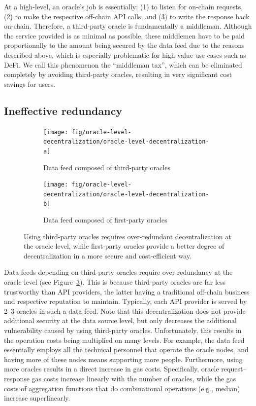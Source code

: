 \documentclass[11pt]{article}
\begin{document}
At a high-level, an oracle’s job is essentially: (1) to listen for on-chain requests, (2) to make the respective off-chain API calls, and (3) to write the response back on-chain.
Therefore, a third-party oracle is fundamentally a middleman.
Although the service provided is as minimal as possible, these middlemen have to be paid proportionally to the amount being secured by the data feed due to the reasons described above, which is especially problematic for high-value use cases such as DeFi.
We call this phenomenon the ``middleman tax'', which can be eliminated completely by avoiding third-party oracles, resulting in very significant cost savings for users.

\subsection{Ineffective redundancy}
\label{sec:ineffective-redundancy}

\begin{figure}
    \centering
    \begin{subfigure}{0.5\textwidth}
         \centering
         \texttt{[image: fig/oracle-level-decentralization/oracle-level-decentralization-a]}
         \caption{Data feed composed of third-party oracles}
         \label{fig:oracle-level-decentralization-a}
     \end{subfigure}
     \hfill
     \begin{subfigure}{0.49\textwidth}
         \centering
         \texttt{[image: fig/oracle-level-decentralization/oracle-level-decentralization-b]}
         \caption{Data feed composed of first-party oracles}
         \label{fig:oracle-level-decentralization-b}
     \end{subfigure}
	\caption{Using third-party oracles requires over-redundant decentralization at the oracle level, while first-party oracles provide a better degree of decentralization in a more secure and cost-efficient way.}
	\label{fig:oracle-level-decentralization}
\end{figure}

Data feeds depending on third-party oracles require over-redundancy at the oracle level (see Figure~\ref{fig:oracle-level-decentralization}).
This is because third-party oracles are far less trustworthy than API providers, the latter having a traditional off-chain business and respective reputation to maintain.
Typically, each API provider is served by 2--3 oracles in such a data feed.
Note that this decentralization does not provide additional security at the data source level, but only decreases the additional vulnerability caused by using third-party oracles.
Unfortunately, this results in the operation costs being multiplied on many levels.
For example, the data feed essentially employs all the technical personnel that operate the oracle nodes, and having more of these nodes means supporting more people.
Furthermore, using more oracles results in a direct increase in gas costs.
Specifically, oracle request--response gas costs increase linearly with the number of oracles, while the gas costs of aggregation functions that do combinational operations (e.g., median) increase superlinearly.
\end{document}
